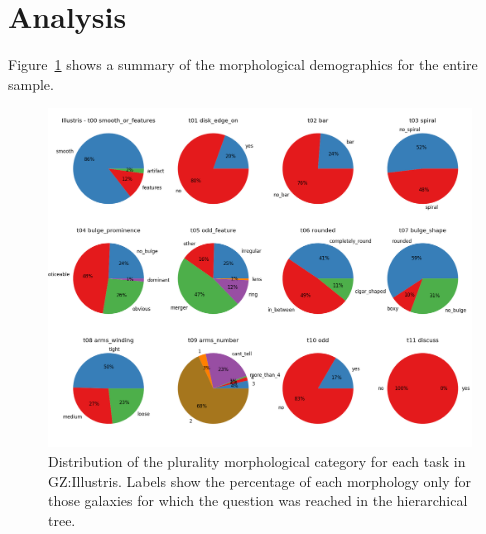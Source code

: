 \documentclass[iop,apj,tighten]{emulateapj}
\begin{document}
\section{Analysis}

Figure~\ref{fig:piechart} shows a summary of the morphological demographics for the entire sample. 

\begin{figure}
\centering
\includegraphics[width=160mm]{../plots/pie_illustris.png}
\caption{Distribution of the plurality morphological category for each task in GZ:Illustris. Labels show the percentage of each morphology only for those galaxies for which the question was reached in the hierarchical tree.\label{fig:piechart}}
\end{figure}


\acknowledgments{
}



\end{document}
